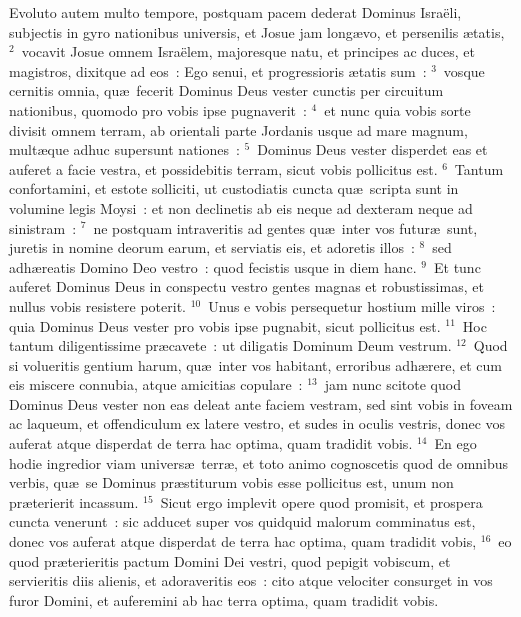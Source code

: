 \lettrine[lines=3,image=true,loversize=0.05,lraise=-0.03]{E}{}voluto autem multo tempore, postquam pacem dederat Dominus Isra\"eli, subjectis in gyro nationibus universis, et Josue jam long\ae vo, et persenilis \ae tatis,
${}^{2}$~vocavit Josue omnem Isra\"elem, majoresque natu, et principes ac duces, et magistros, dixitque ad eos~: Ego senui, et progressioris \ae tatis sum~:
${}^{3}$~vosque cernitis omnia, qu\ae\ fecerit Dominus Deus vester cunctis per circuitum nationibus, quomodo pro vobis ipse pugnaverit~:
${}^{4}$~et nunc quia vobis sorte divisit omnem terram, ab orientali parte Jordanis usque ad mare magnum, mult\ae que adhuc supersunt nationes~:
${}^{5}$~Dominus Deus vester disperdet eas et auferet a facie vestra, et possidebitis terram, sicut vobis pollicitus est.
${}^{6}$~Tantum confortamini, et estote solliciti, ut custodiatis cuncta qu\ae\ scripta sunt in volumine legis Moysi~: et non declinetis ab eis neque ad dexteram neque ad sinistram~:
${}^{7}$~ne postquam intraveritis ad gentes qu\ae\ inter vos futur\ae\ sunt, juretis in nomine deorum earum, et serviatis eis, et adoretis illos~:
${}^{8}$~sed adh\ae reatis Domino Deo vestro~: quod fecistis usque in diem hanc.
${}^{9}$~Et tunc auferet Dominus Deus in conspectu vestro gentes magnas et robustissimas, et nullus vobis resistere poterit.
${}^{10}$~Unus e vobis persequetur hostium mille viros~: quia Dominus Deus vester pro vobis ipse pugnabit, sicut pollicitus est.
${}^{11}$~Hoc tantum diligentissime pr\ae cavete~: ut diligatis Dominum Deum vestrum.
${}^{12}$~Quod si volueritis gentium harum, qu\ae\ inter vos habitant, erroribus adh\ae rere, et cum eis miscere connubia, atque amicitias copulare~:
${}^{13}$~jam nunc scitote quod Dominus Deus vester non eas deleat ante faciem vestram, sed sint vobis in foveam ac laqueum, et offendiculum ex latere vestro, et sudes in oculis vestris, donec vos auferat atque disperdat de terra hac optima, quam tradidit vobis.
${}^{14}$~En ego hodie ingredior viam univers\ae\ terr\ae , et toto animo cognoscetis quod de omnibus verbis, qu\ae\ se Dominus pr\ae stiturum vobis esse pollicitus est, unum non pr\ae terierit incassum.
${}^{15}$~Sicut ergo implevit opere quod promisit, et prospera cuncta venerunt~: sic adducet super vos quidquid malorum comminatus est, donec vos auferat atque disperdat de terra hac optima, quam tradidit vobis,
${}^{16}$~eo quod pr\ae terieritis pactum Domini Dei vestri, quod pepigit vobiscum, et servieritis diis alienis, et adoraveritis eos~: cito atque velociter consurget in vos furor Domini, et auferemini ab hac terra optima, quam tradidit vobis.

